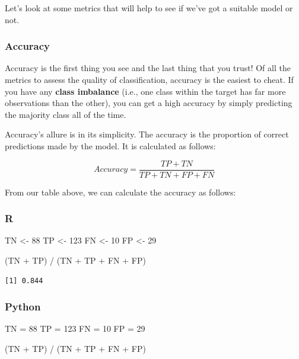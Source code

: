 \documentclass[
  letterpaper,
]{krantz}
\newenvironment{Shaded}{}{}
\newcommand{\DecValTok}[1]{\textcolor[rgb]{0.25,0.63,0.44}{#1}}
\newcommand{\NormalTok}[1]{#1}
\newcommand{\OperatorTok}[1]{\textcolor[rgb]{0.40,0.40,0.40}{#1}}
\newcommand{\OtherTok}[1]{\textcolor[rgb]{0.00,0.44,0.13}{#1}}
\newcommand{\SpecialCharTok}[1]{\textcolor[rgb]{0.25,0.44,0.63}{#1}}
\begin{document}
Let's look at some metrics that will help to see if we've got a suitable
model or not.

\subsubsection{Accuracy}\label{accuracy}

Accuracy is the first thing you see and the last thing that you trust!
Of all the metrics to assess the quality of classification, accuracy is
the easiest to cheat. If you have any \textbf{class imbalance} (i.e.,
one class within the target has far more observations than the other),
you can get a high accuracy by simply predicting the majority class all
of the time.

Accuracy's allure is in its simplicity. The accuracy is the proportion
of correct predictions made by the model. It is calculated as follows:

\[Accuracy = \frac{TP + TN}{TP + TN + FP + FN}\]

From our table above, we can calculate the accuracy as follows:

\subsubsection{R}

\begin{Shaded}
\begin{Highlighting}[]
\NormalTok{TN }\OtherTok{\textless{}{-}} \DecValTok{88}
\NormalTok{TP }\OtherTok{\textless{}{-}} \DecValTok{123}
\NormalTok{FN }\OtherTok{\textless{}{-}} \DecValTok{10}
\NormalTok{FP }\OtherTok{\textless{}{-}} \DecValTok{29}

\NormalTok{(TN }\SpecialCharTok{+}\NormalTok{ TP) }\SpecialCharTok{/}\NormalTok{ (TN }\SpecialCharTok{+}\NormalTok{ TP }\SpecialCharTok{+}\NormalTok{ FN }\SpecialCharTok{+}\NormalTok{ FP)}
\end{Highlighting}
\end{Shaded}

\begin{verbatim}
[1] 0.844
\end{verbatim}

\subsubsection{Python}

\begin{Shaded}
\begin{Highlighting}[]
\NormalTok{TN }\OperatorTok{=} \DecValTok{88}
\NormalTok{TP }\OperatorTok{=} \DecValTok{123}
\NormalTok{FN }\OperatorTok{=} \DecValTok{10}
\NormalTok{FP }\OperatorTok{=} \DecValTok{29}

\NormalTok{(TN }\OperatorTok{+}\NormalTok{ TP) }\OperatorTok{/}\NormalTok{ (TN }\OperatorTok{+}\NormalTok{ TP }\OperatorTok{+}\NormalTok{ FN }\OperatorTok{+}\NormalTok{ FP)}
\end{Highlighting}
\end{Shaded}
\end{document}
